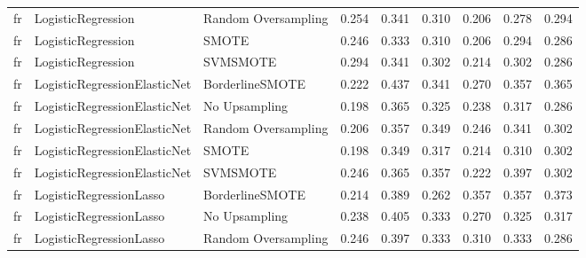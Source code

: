 \begin{tabular}{lllllllll}
      fr &           LogisticRegression & Random Oversampling &     0.254 &                     0.341 &                 0.310 &                  0.206 &                                   0.278 &     0.294 \\
      fr &           LogisticRegression &               SMOTE &     0.246 &                     0.333 &                 0.310 &                  0.206 &                                   0.294 &     0.286 \\
      fr &           LogisticRegression &            SVMSMOTE &     0.294 &                     0.341 &                 0.302 &                  0.214 &                                   0.302 &     0.286 \\
      fr & LogisticRegressionElasticNet &     BorderlineSMOTE &     0.222 &                     0.437 &                 0.341 &                  0.270 &                                   0.357 &     0.365 \\
      fr & LogisticRegressionElasticNet &       No Upsampling &     0.198 &                     0.365 &                 0.325 &                  0.238 &                                   0.317 &     0.286 \\
      fr & LogisticRegressionElasticNet & Random Oversampling &     0.206 &                     0.357 &                 0.349 &                  0.246 &                                   0.341 &     0.302 \\
      fr & LogisticRegressionElasticNet &               SMOTE &     0.198 &                     0.349 &                 0.317 &                  0.214 &                                   0.310 &     0.302 \\
      fr & LogisticRegressionElasticNet &            SVMSMOTE &     0.246 &                     0.365 &                 0.357 &                  0.222 &                                   0.397 &     0.302 \\
      fr &      LogisticRegressionLasso &     BorderlineSMOTE &     0.214 &                     0.389 &                 0.262 &                  0.357 &                                   0.357 &     0.373 \\
      fr &      LogisticRegressionLasso &       No Upsampling &     0.238 &                     0.405 &                 0.333 &                  0.270 &                                   0.325 &     0.317 \\
      fr &      LogisticRegressionLasso & Random Oversampling &     0.246 &                     0.397 &                 0.333 &                  0.310 &                                   0.333 &     0.286 \\

\end{tabular}
